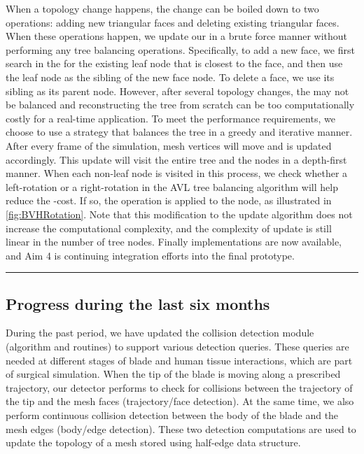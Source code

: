 When a topology change happens, the change can be boiled down to two operations: adding new triangular faces and deleting existing triangular faces. When these operations happen, we update our  in a brute force manner without performing any tree balancing operations. Specifically, to add a new face, we first search in the  for the existing leaf node that is closest to the face, and then use the leaf node as the sibling of the new face node. To delete a face, we use its sibling as its parent node. However, after several topology changes, the  may not be balanced and reconstructing the tree from scratch can be too computationally costly for a real-time application. To meet the performance requirements, we choose to use a strategy that balances the tree in a greedy and iterative manner. After every frame of the  simulation, mesh vertices will move and  is updated accordingly. This update will visit the entire tree and the nodes in a depth-first manner. When each non-leaf node is visited in this process, we check whether a left-rotation or a right-rotation in the AVL tree balancing algorithm will help reduce the -cost. If so, the operation is applied to the node, as illustrated in \autoref{fig:BVHRotation}. Note that this modification to the  update algorithm does not increase the computational complexity, and the complexity of  update is still linear in the number of tree nodes. Finally  implementations are now available, and Aim 4 is continuing integration efforts into the final prototype.

\hrule%

\subsection{Progress during the last six months}
During the past period, we have updated the collision detection module (algorithm and routines) to support various detection queries. These queries are needed at different stages of blade and human tissue interactions, which are part of surgical simulation. When the tip of the blade is moving along a prescribed trajectory, our detector performs  to check for collisions between the trajectory of the tip and the mesh faces (trajectory/face detection). At the same time, we also perform continuous collision detection between the body of the blade and the mesh edges (body/edge detection). These two detection computations are used to update the topology of a mesh stored using half-edge data structure.

